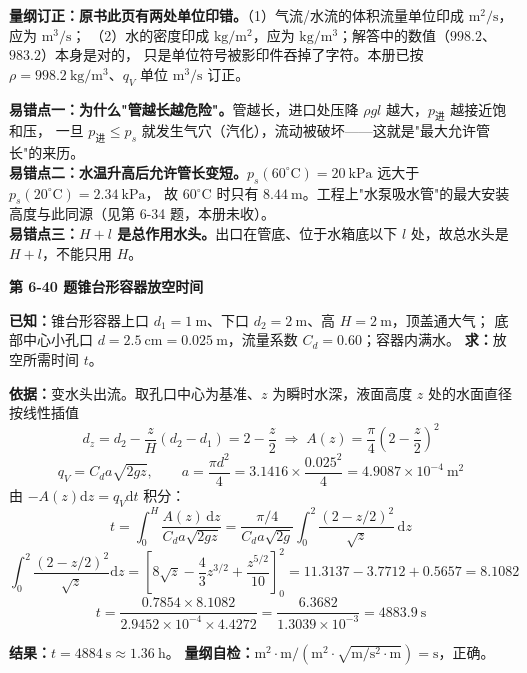 \begin{tishi}
\textbf{量纲订正：原书此页有两处单位印错。}（1）气流/水流的体积流量单位印成 $\mathrm{m^2/s}$，应为 $\mathrm{m^3/s}$；
（2）水的密度印成 $\mathrm{kg/m^2}$，应为 $\mathrm{kg/m^3}$；解答中的数值（$998.2$、$983.2$）本身是对的，
只是单位符号被影印件吞掉了字符。本册已按 $\rho=998.2\ \mathrm{kg/m^3}$、$q_V$ 单位 $\mathrm{m^3/s}$ 订正。
\end{tishi}

\begin{yicuo}
\textbf{易错点一：为什么"管越长越危险"。}管越长，进口处压降 $\rho gl$ 越大，$p_{\text{进}}$ 越接近饱和压，
一旦 $p_{\text{进}}\le p_s$ 就发生气穴（汽化），流动被破坏——这就是"最大允许管长"的来历。\\
\textbf{易错点二：水温升高后允许管长变短。}$p_s(60^\circ\mathrm{C})=20\ \mathrm{kPa}$ 远大于 $p_s(20^\circ\mathrm{C})=2.34\ \mathrm{kPa}$，
故 60$^\circ$C 时只有 $8.44\ \mathrm{m}$。工程上"水泵吸水管"的最大安装高度与此同源（见第 6-34 题，本册未收）。\\
\textbf{易错点三：$H+l$ 是总作用水头。}出口在管底、位于水箱底以下 $l$ 处，故总水头是 $H+l$，不能只用 $H$。
\end{yicuo}

\noindent\textbf{第 6-40 题\quad 锥台形容器放空时间}

\begin{jie}
\textbf{已知：}锥台形容器上口 $d_1=1\ \mathrm{m}$、下口 $d_2=2\ \mathrm{m}$、高 $H=2\ \mathrm{m}$，顶盖通大气；
底部中心小孔口 $d=2.5\ \mathrm{cm}=0.025\ \mathrm{m}$，流量系数 $C_d=0.60$；容器内满水。
\textbf{求：}放空所需时间 $t$。

\textbf{依据：}变水头出流。取孔口中心为基准、$z$ 为瞬时水深，液面高度 $z$ 处的水面直径按线性插值
\[ d_z=d_2-\frac{z}{H}(d_2-d_1)=2-\frac{z}{2}\;\Longrightarrow\;
A(z)=\frac{\pi}{4}\left(2-\frac{z}{2}\right)^2 \]
\[ q_V=C_da\sqrt{2gz},\qquad a=\frac{\pi d^2}{4}=3.1416\times\frac{0.025^2}{4}=4.9087\times10^{-4}\ \mathrm{m^2} \]
由 $-A(z)\mathrm dz=q_V\mathrm dt$ 积分：
\[ t=\int_0^{H}\frac{A(z)\,\mathrm dz}{C_da\sqrt{2gz}}
=\frac{\pi/4}{C_da\sqrt{2g}}\int_0^2\frac{(2-z/2)^2}{\sqrt z}\,\mathrm dz \]
\[ \int_0^2\frac{(2-z/2)^2}{\sqrt z}\mathrm dz
=\left[8\sqrt z-\frac43z^{3/2}+\frac{z^{5/2}}{10}\right]_0^2
=11.3137-3.7712+0.5657=8.1082 \]
\[ t=\frac{0.7854\times8.1082}{2.9452\times10^{-4}\times4.4272}
=\frac{6.3682}{1.3039\times10^{-3}}=4883.9\ \mathrm{s} \]

\textbf{结果：}$t=4884\ \mathrm{s}\approx1.36\ \mathrm{h}$。
\textbf{量纲自检：}$\mathrm{m^2\cdot m/(m^2\cdot\sqrt{m/s^2\cdot m})}=\mathrm{s}$，正确。
\end{jie}

